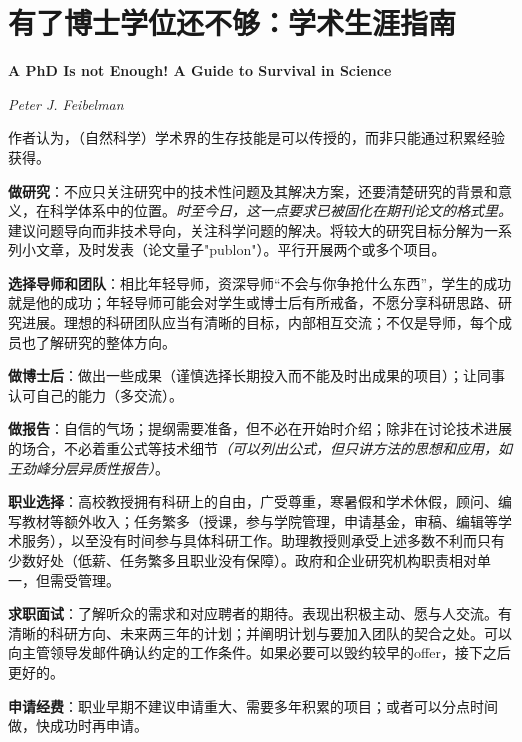 
\chapter{有了博士学位还不够：学术生涯指南}
\Large\textbf{A PhD Is not Enough! A Guide to Survival in Science}
\par \emph{Peter J. Feibelman} \normalsize

\par 作者认为，（自然科学）学术界的生存技能是可以传授的，而非只能通过积累经验获得。

\par \textbf{做研究}：不应只关注研究中的技术性问题及其解决方案，还要清楚研究的背景和意义，在科学体系中的位置。\emph{时至今日，这一点要求已被固化在期刊论文的格式里。} 建议问题导向而非技术导向，关注科学问题的解决。将较大的研究目标分解为一系列小文章，及时发表（论文量子"publon"）。平行开展两个或多个项目。

\par \textbf{选择导师和团队}：相比年轻导师，资深导师“不会与你争抢什么东西”，学生的成功就是他的成功；年轻导师可能会对学生或博士后有所戒备，不愿分享科研思路、研究进展。理想的科研团队应当有清晰的目标，内部相互交流；不仅是导师，每个成员也了解研究的整体方向。

\par \textbf{做博士后}：做出一些成果（谨慎选择长期投入而不能及时出成果的项目）；让同事认可自己的能力（多交流）。

\par \textbf{做报告}：自信的气场；提纲需要准备，但不必在开始时介绍；除非在讨论技术进展的场合，不必着重公式等技术细节\emph{（可以列出公式，但只讲方法的思想和应用，如王劲峰分层异质性报告）}。

\par \textbf{职业选择}：高校教授拥有科研上的自由，广受尊重，寒暑假和学术休假，顾问、编写教材等额外收入；任务繁多（授课，参与学院管理，申请基金，审稿、编辑等学术服务），以至没有时间参与具体科研工作。助理教授则承受上述多数不利而只有少数好处（低薪、任务繁多且职业没有保障）。政府和企业研究机构职责相对单一，但需受管理。

\par \textbf{求职面试}：了解听众的需求和对应聘者的期待。表现出积极主动、愿与人交流。有清晰的科研方向、未来两三年的计划；并阐明计划与要加入团队的契合之处。可以向主管领导发邮件确认约定的工作条件。如果必要可以毁约较早的offer，接下之后更好的。

\par \textbf{申请经费}：职业早期不建议申请重大、需要多年积累的项目；或者可以分点时间做，快成功时再申请。